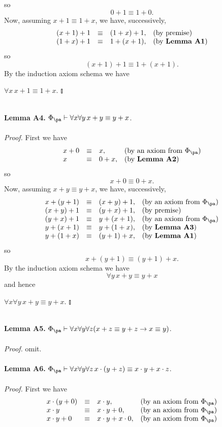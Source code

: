 so
\[
0 + 1 \equiv 1 + 0.
\]
Now, assuming $x + 1 \equiv 1 + x$, we have, successively,
\[
\begin{array}{llll}
(x + 1) + 1 & \equiv & (1 + x) + 1, & \mbox{(by premise)}\cr
(1 + x) + 1 & \equiv & 1 + (x + 1), & \mbox{(by \textbf{Lemma A1})}
\end{array}
\]
so
\[
(x + 1) + 1 \equiv 1 + (x + 1).
\]
By the induction axiom schema we have
\begin{center}
\phantom{$\talloblong$} \hfill $\forall x \, x + 1 \equiv 1 + x.$ \hfill $\talloblong$
\end{center}
\ \\
\textbf{Lemma A4.} $\Phi_\pa \vdash \forall x \forall y \, x + y \equiv y + x$.\\
\ \\
\textit{Proof.} First we have
\[
\begin{array}{llll}
x + 0 & \equiv & x, & \mbox{(by an axiom from $\Phi_\pa$)}\cr
x & \equiv & 0 + x, & \mbox{(by \textbf{Lemma A2})}\cr
\end{array}
\]
so
\[
x + 0 \equiv 0 + x.
\]
Now, assuming $x + y \equiv y + x$, we have, successively,
\[
\begin{array}{llll}
x + (y + 1) & \equiv & (x + y) + 1, & \mbox{(by an axiom from $\Phi_\pa$)}\cr
(x + y) + 1 & \equiv & (y + x) + 1, & \mbox{(by premise)}\cr
(y + x) + 1 & \equiv & y + (x + 1), & \mbox{(by an axiom from $\Phi_\pa$)}\cr
y + (x + 1) & \equiv & y + (1 + x), & \mbox{(by \textbf{Lemma A3})}\cr
y + (1 + x) & \equiv & (y + 1) + x, & \mbox{(by \textbf{Lemma A1})}
\end{array}
\]
so
\[
x + (y + 1) \equiv (y + 1) + x.
\]
By the induction axiom schema we have
\[
\forall y \, x + y \equiv y + x
\]
and hence
\begin{center}
\phantom{$\talloblong$} \hfill $\forall x \forall y \, x + y \equiv y + x.$ \hfill $\talloblong$
\end{center}
\ \\
\textbf{Lemma A5.} $\Phi_\pa \vdash \forall x \forall y \forall z (x + z \equiv y + z \rightarrow x \equiv y)$.\\
\ \\
\textit{Proof.} omit.\\
\ \\
\textbf{Lemma A6.} $\Phi_\pa \vdash \forall x \forall y \forall z \, x \cdot (y + z) \equiv x \cdot y + x \cdot z$.\\
\ \\
\textit{Proof.} First we have
\[
\begin{array}{llll}
x \cdot (y + 0) & \equiv & x \cdot y, & \mbox{(by an axiom from $\Phi_\pa$)}\cr
x \cdot y & \equiv & x \cdot y + 0, & \mbox{(by an axiom from $\Phi_\pa$)}\cr
x \cdot y + 0 & \equiv & x \cdot y + x \cdot 0, & \mbox{(by an axiom from $\Phi_\pa$)} 
\end{array}
\]
